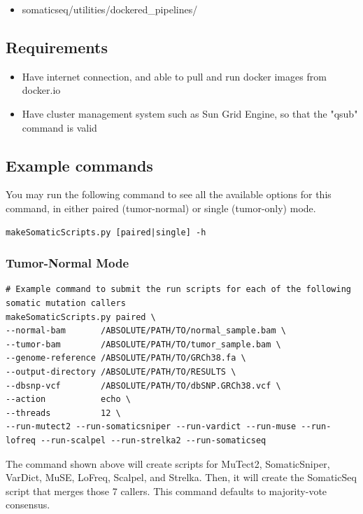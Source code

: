 \documentclass[10pt,letterpaper]{article}
\begin{document}
\begin{sloppypar}
  \begin{itemize}
    \item somaticseq/utilities/dockered\_pipelines/
  \end{itemize}

\subsection{Requirements}

  \begin{itemize}
    \item Have internet connection, and able to pull and run docker images from docker.io
    \item Have cluster management system such as Sun Grid Engine, so that the "qsub" command is valid
  \end{itemize}


\subsection{Example commands}

You may run the following command to see all the available options for this command, in either paired (tumor-normal) or single (tumor-only) mode.

\begin{lstlisting}
makeSomaticScripts.py [paired|single] -h
\end{lstlisting} 

\subsubsection{Tumor-Normal Mode}

\begin{lstlisting}
# Example command to submit the run scripts for each of the following somatic mutation callers
makeSomaticScripts.py paired \
--normal-bam       /ABSOLUTE/PATH/TO/normal_sample.bam \
--tumor-bam        /ABSOLUTE/PATH/TO/tumor_sample.bam \
--genome-reference /ABSOLUTE/PATH/TO/GRCh38.fa \
--output-directory /ABSOLUTE/PATH/TO/RESULTS \
--dbsnp-vcf        /ABSOLUTE/PATH/TO/dbSNP.GRCh38.vcf \
--action           echo \
--threads          12 \
--run-mutect2 --run-somaticsniper --run-vardict --run-muse --run-lofreq --run-scalpel --run-strelka2 --run-somaticseq
\end{lstlisting}

The command shown above will create scripts for MuTect2, SomaticSniper, VarDict, MuSE, LoFreq, Scalpel, and Strelka. Then, it will create the SomaticSeq script that merges those 7 callers. This command defaults to majority-vote consensus.


\end{sloppypar}
\end{document}
